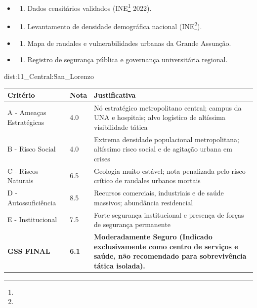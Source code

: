 {\begin{itemize}
\tightlist
\item
  \begin{enumerate}
  \def\labelenumi{\arabic{enumi})}
  \tightlist
  \item
    Dados censitários validados (INE\footnote{\fineINE} 2022).
  \end{enumerate}
\item
  \begin{enumerate}
  \def\labelenumi{\arabic{enumi})}
  \setcounter{enumi}{1}
  \tightlist
  \item
    Levantamento de densidade demográfica nacional (INE\footnote{\fineINE}).
  \end{enumerate}
\item
  \begin{enumerate}
  \def\labelenumi{\arabic{enumi})}
  \setcounter{enumi}{2}
  \tightlist
  \item
    Mapa de raudales e vulnerabilidades urbanas da Grande Assunção.
  \end{enumerate}
\item
  \begin{enumerate}
  \def\labelenumi{\arabic{enumi})}
  \setcounter{enumi}{3}
  \tightlist
  \item
    Registro de segurança pública e governança universitária regional.
  \end{enumerate}
\end{itemize}}{dist:11_Central:San_Lorenzo}
\begin{table}[ht!]
\small \begin{tabular}{p{3.0cm}p{0.8cm}p{6.0cm}} \toprule
\textbf{Critério} & \textbf{Nota} & \textbf{Justificativa} \\ \midrule
A - Ameaças Estratégicas & 4.0 & Nó estratégico metropolitano central; campus da UNA e hospitais; alvo logístico de altíssima visibilidade tática \\
B - Risco Social & 4.0 & Extrema densidade populacional metropolitana; altíssimo risco social e de agitação urbana em crises \\
C - Riscos Naturais & 6.5 & Geologia muito estável; nota penalizada pelo risco crítico de raudales urbanos mortais \\
D - Autossuficiência & 8.5 & Recursos comerciais, industriais e de saúde massivos; abundância residencial \\
E - Institucional & 7.5 & Forte segurança institucional e presença de forças de segurança permanente \\
\midrule \textbf{GSS FINAL} & \textbf{6.1} & \textbf{Moderadamente Seguro (Indicado exclusivamente como centro de serviços e saúde, não recomendado para sobrevivência tática isolada).} \\ \bottomrule \end{tabular}
\end{table}
